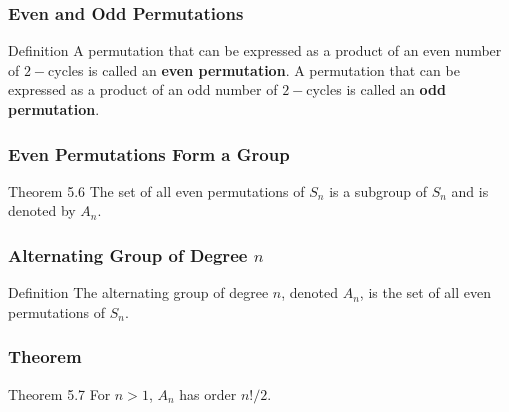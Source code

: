 \documentclass{beamer}
\begin{document}
\begin{frame}
    \frametitle{Even and Odd Permutations}
    \begin{block}{Definition}
        A permutation that can be expressed as a product of an even number of \(2-\)cycles is called an \textbf{even permutation}. A permutation that can be expressed as a product of an odd number of \(2-\)cycles is called an \textbf{odd permutation}.
    \end{block}
    

\end{frame}

\begin{frame}
    \frametitle{Even Permutations Form a Group} 
    \begin{block}{Theorem 5.6}
        The set of all even permutations of \(S_n\) is a subgroup of \(S_n\) and is denoted by \(A_n\).
    \end{block}
    

\end{frame}

\begin{frame}
    \frametitle{Alternating Group of Degree \(n\)}

    \begin{block}{Definition}
        The alternating group of degree \(n\), denoted \(A_n\), is the set of all even permutations of \(S_n\).
        
    \end{block}

\end{frame}

\begin{frame}
    \frametitle{Theorem}

    \begin{block}{Theorem 5.7}
        For \(n >1\), \(A_n\) has order \(n!/2\). 
    \end{block}

\end{frame}
\end{document}
